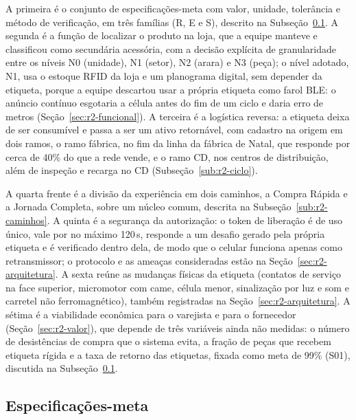A primeira é o conjunto de especificações-meta com valor, unidade, tolerância e método de verificação, em três famílias (R, E e S), descrito na Subseção~\ref{sub:r2-especificacoes}. A segunda é a função de localizar o produto na loja, que a equipe manteve e classificou como secundária acessória, com a decisão explícita de granularidade entre os níveis N0 (unidade), N1 (setor), N2 (arara) e N3 (peça); o nível adotado, N1, usa o estoque RFID da loja e um planograma digital, sem depender da etiqueta, porque a equipe descartou usar a própria etiqueta como farol BLE: o anúncio contínuo esgotaria a célula antes do fim de um ciclo e daria erro de metros (Seção~\ref{sec:r2-funcional}). A terceira é a logística reversa: a etiqueta deixa de ser consumível e passa a ser um ativo retornável, com cadastro na origem em dois ramos, o ramo fábrica, no fim da linha da fábrica de Natal, que responde por cerca de 40\% do que a rede vende, e o ramo CD, nos centros de distribuição, além de inspeção e recarga no CD (Subseção~\ref{sub:r2-ciclo}).

A quarta frente é a divisão da experiência em dois caminhos, a Compra Rápida e a Jornada Completa, sobre um núcleo comum, descrita na Subseção~\ref{sub:r2-caminhos}. A quinta é a segurança da autorização: o token de liberação é de uso único, vale por no máximo 120\,s, responde a um desafio gerado pela própria etiqueta e é verificado dentro dela, de modo que o celular funciona apenas como retransmissor; o protocolo e as ameaças consideradas estão na Seção~\ref{sec:r2-arquitetura}. A sexta reúne as mudanças físicas da etiqueta (contatos de serviço na face superior, micromotor com came, célula menor, sinalização por luz e som e carretel não ferromagnético), também registradas na Seção~\ref{sec:r2-arquitetura}. A sétima é a viabilidade econômica para o varejista e para o fornecedor (Seção~\ref{sec:r2-valor}), que depende de três variáveis ainda não medidas: o número de desistências de compra que o sistema evita, a fração de peças que recebem etiqueta rígida e a taxa de retorno das etiquetas, fixada como meta de 99\% (S01), discutida na Subseção~\ref{sub:r2-especificacoes}.

\subsection{Especificações-meta}
\label{sub:r2-especificacoes}

